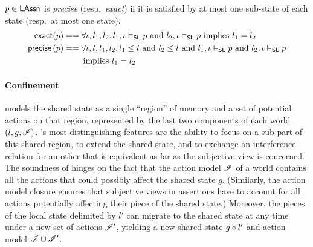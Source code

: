 
\begin{definition}
  $p\in\mathsf{LAssn}$ is \emph{precise} (resp.\ \emph{exact}) if it is
  satisfied by at most one sub-state of each state (resp.\ at most one
  state).
  \begin{align*}
    \textsf{exact}(p) &==
    \forall \iota, l_1, l_2.\, l_1, \iota \mathrel{\vDash_{\mathsf{SL}}} p\text{ and }l_2, \iota
    \mathrel{\vDash_{\mathsf{SL}}} p\text{ implies } l_1 = l_2\\
    \textsf{precise} \left( p \right) &==
    \forall \iota, l, l_1, l_2.\, l_1\leq l\text{ and }l_2\leq l\text{ and }l_1, \iota \mathrel{\vDash_{\mathsf{SL}}} p\text{ and }l_2, \iota
    \mathrel{\vDash_{\mathsf{SL}}} p\\
    &\qquad\text{ implies } l_1 = l_2
  \end{align*}
\end{definition}

\paragraph{Confinement}
\colosl models the shared state as a single ``region'' of memory and a
set of potential actions on that region, represented by the last two
components of each world $(l,g,\mathscr{I})$. \colosl's most
distinguishing features are the ability to focus on a sub-part of this
shared region, to extend the shared state, and to exchange an
interference relation for an other that is equivalent as far as the
subjective view is concerned. The soundness of \colosl hinges on the
fact that the action model $\mathscr{I}$ of a world contains all the actions
that could possibly affect the shared state $g$. (Similarly, the
action model closure ensures that subjective views in assertions have
to account for all actions potentially affecting their piece of the shared
state.) Moreover, the pieces of the local state delimited by $l'$ can migrate to
the shared state at any time under a new set of actions $\mathscr{I}'$,
yielding a new shared state $g\circ l'$ and action model $\mathscr{I}
\cup \mathscr{I}'$.

